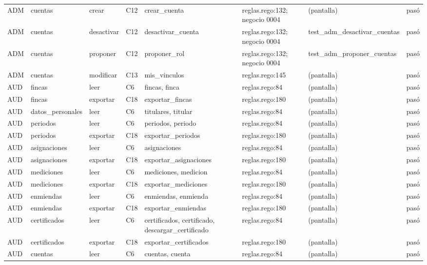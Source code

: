 \begin{center}
\begin{longtable}{@{}p{0.6cm} p{1.7cm} p{1.2cm} p{0.9cm} p{3.4cm} p{2.6cm} p{3.4cm} p{0.8cm}@{}}
ADM & cuentas & crear & C12 & crear\_cuenta & reglas.rego:132; negocio 0004 & (pantalla) & pasó \\
ADM & cuentas & desactivar & C12 & desactivar\_cuenta & reglas.rego:132; negocio 0004 & test\_\allowbreak{}adm\_\allowbreak{}desactivar\_\allowbreak{}cuentas & pasó \\
ADM & cuentas & proponer & C12 & proponer\_rol & reglas.rego:132; negocio 0004 & test\_\allowbreak{}adm\_\allowbreak{}proponer\_\allowbreak{}cuentas & pasó \\
ADM & cuentas & modificar & C13 & mis\_vinculos & reglas.rego:145 & (pantalla) & pasó \\
AUD & fincas & leer & C6 & fincas, \allowbreak{}finca & reglas.rego:84 & (pantalla) & pasó \\
AUD & fincas & exportar & C18 & exportar\_fincas & reglas.rego:180 & (pantalla) & pasó \\
AUD & datos\_\allowbreak{}personales & leer & C6 & titulares, \allowbreak{}titular & reglas.rego:84 & (pantalla) & pasó \\
AUD & periodos & leer & C6 & periodos, \allowbreak{}periodo & reglas.rego:84 & (pantalla) & pasó \\
AUD & periodos & exportar & C18 & exportar\_periodos & reglas.rego:180 & (pantalla) & pasó \\
AUD & asignaciones & leer & C6 & asignaciones & reglas.rego:84 & (pantalla) & pasó \\
AUD & asignaciones & exportar & C18 & exportar\_asignaciones & reglas.rego:180 & (pantalla) & pasó \\
AUD & mediciones & leer & C6 & mediciones, \allowbreak{}medicion & reglas.rego:84 & (pantalla) & pasó \\
AUD & mediciones & exportar & C18 & exportar\_mediciones & reglas.rego:180 & (pantalla) & pasó \\
AUD & enmiendas & leer & C6 & enmiendas, \allowbreak{}enmienda & reglas.rego:84 & (pantalla) & pasó \\
AUD & enmiendas & exportar & C18 & exportar\_enmiendas & reglas.rego:180 & (pantalla) & pasó \\
AUD & certificados & leer & C6 & certificados, \allowbreak{}certificado, \allowbreak{}descargar\_certificado & reglas.rego:84 & (pantalla) & pasó \\
AUD & certificados & exportar & C18 & exportar\_certificados & reglas.rego:180 & (pantalla) & pasó \\
AUD & cuentas & leer & C6 & cuentas, \allowbreak{}cuenta & reglas.rego:84 & (pantalla) & pasó \\

\end{longtable}
\end{center}

